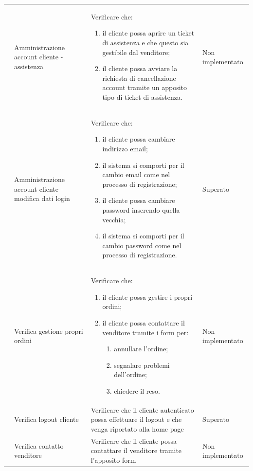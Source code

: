 \begin{center}
\begin{longtable}{|p{0.85cm}|p{2.25cm}|p{9cm}|p{3cm}|}
		 & Amministrazione account cliente - assistenza & Verificare che:
		\begin{enumerate}
			\item il cliente possa aprire un ticket di assistenza e che questo sia gestibile dal venditore;
			\item il cliente possa avviare la richiesta di cancellazione account tramite un apposito tipo di ticket di assistenza.
		\end{enumerate} & Non implementato\\

		 & Amministrazione account cliente - modifica dati login & Verificare che:
		\begin{enumerate}
			\item il cliente possa cambiare indirizzo email;
			\item il sistema si comporti per il cambio email come nel processo di registrazione;
			\item il cliente possa cambiare password inserendo quella vecchia;
			\item il sistema si comporti per il cambio password come nel processo di registrazione. 
		\end{enumerate} & Superato\\

		 & Verifica gestione propri ordini & Verificare che:
		\begin{enumerate}
			\item il cliente possa gestire i propri ordini;
			\item il cliente possa contattare il venditore tramite i form per:
			\begin{enumerate}
				\item annullare l'ordine;
				\item segnalare problemi dell'ordine;
				\item chiedere il reso.
			\end{enumerate}
		\end{enumerate} & Non implementato\\

		 & Verifica logout cliente & Verificare che il cliente autenticato possa effettuare il logout e che venga riportato alla home page & Superato\\

		 & Verifica contatto venditore & Verificare che il cliente possa contattare il venditore tramite l'apposito form  & Non implementato\\


\end{longtable}
\end{center}
